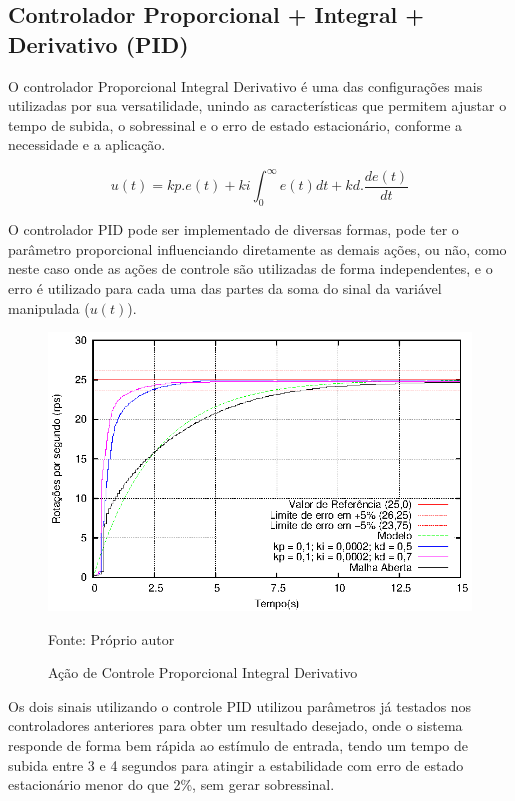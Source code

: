 \subsection{ Controlador Proporcional + Integral + Derivativo (PID) }

O controlador Proporcional Integral Derivativo é uma das configurações mais utilizadas por sua versatilidade, unindo as características que permitem ajustar o tempo de subida, o sobressinal e o erro de estado estacionário, conforme a necessidade e a aplicação.

\begin{equation}
u(t) = kp.e(t) + ki \int_{0}^{\infty} e(t) dt + kd. \frac{d e(t)}{dt}
\end{equation}

O controlador PID pode ser implementado de diversas formas, pode ter o parâmetro proporcional influenciando diretamente as demais ações, ou não, como neste caso onde as ações de controle são utilizadas de forma independentes, e o erro é utilizado para cada uma das partes da soma do sinal da variável manipulada ($u(t)$).

\begin{figure}[!htb]
\centering
\caption{Ação de Controle Proporcional Integral Derivativo}
\center\includegraphics[scale=1.4]{./imagens/acaoPID.eps}
\label{fig:acaoPID}

{\small Fonte: Próprio autor}
\end{figure}

Os dois sinais utilizando o controle PID utilizou parâmetros já testados nos controladores anteriores para obter um resultado desejado, onde o sistema responde de forma bem rápida ao estímulo de entrada, tendo um tempo de subida entre 3 e 4 segundos para atingir a estabilidade com erro de estado estacionário menor do que 2\%, sem gerar sobressinal.


